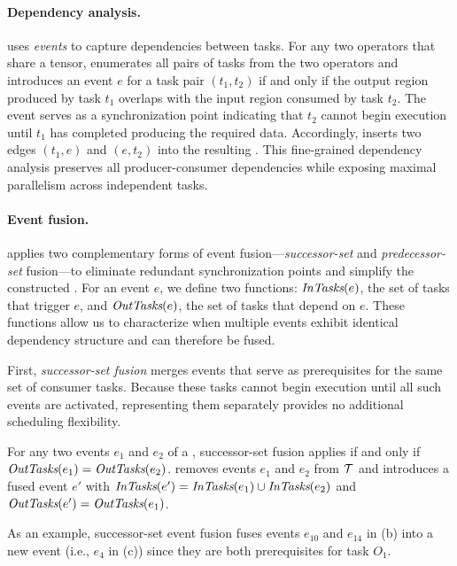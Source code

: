 \paragraph{Dependency analysis.} \Sys uses {\em events} to capture dependencies between tasks. For any two operators that share a tensor, \sys enumerates all pairs of tasks from the two operators and introduces an event $e$ for a task pair $(t_1, t_2)$ if and only if the output region produced by task $t_1$ overlaps with the input region consumed by task $t_2$. The event serves as a synchronization point indicating that $t_2$ cannot begin execution until $t_1$ has completed producing the required data. Accordingly, \sys inserts two edges $(t_1, e)$ and $(e, t_2)$ into the resulting \graph. This fine-grained dependency analysis preserves all producer-consumer dependencies while exposing maximal parallelism across independent tasks.

\paragraph{Event fusion.} \Sys applies two complementary forms of event fusion---{\em successor-set} and {\em predecessor-set} fusion---to eliminate redundant synchronization points and simplify the constructed \graph. 
For an event $e$, we define two functions: $\mbox{\rm\em InTasks}(e)$, the set of tasks that trigger $e$, and $\mbox{\rm\em OutTasks}(e)$, the set of tasks that depend on $e$.
These functions allow us to characterize when multiple events exhibit identical dependency structure and can therefore be fused.

First, {\em successor-set fusion} merges events that serve as prerequisites for the same set of consumer tasks. Because these tasks cannot begin execution until all such events are activated, representing them separately provides no additional scheduling flexibility.

\begin{definition}
For any two events $e_1$ and $e_2$ of a \graph, successor-set fusion applies if and only if $\mbox{\rm\em OutTasks}(e_1) = \mbox{\rm\em OutTasks}(e_2)$. \Sys removes events $e_1$ and $e_2$ from $\cal{T}$ and introduces a fused event $e'$ with $\mbox{\rm\em InTasks}(e') = \mbox{\rm\em InTasks}(e_1) \cup \mbox{\rm\em InTasks}(e_2)$ and $\mbox{\rm\em OutTasks}(e') = \mbox{\rm\em OutTasks}(e_1)$.
\end{definition}

As an example, successor-set event fusion fuses events $e_10$ and $e_{14}$ in (b) into a new event (i.e., $e_4$ in (c)) since they are both prerequisites for task $O_1$.

